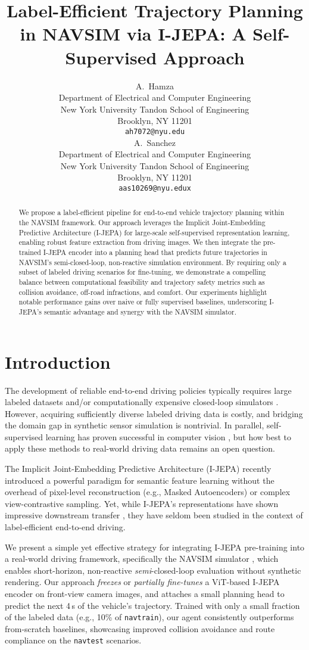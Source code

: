\documentclass{article}
\title{Label-Efficient Trajectory Planning in NAVSIM via I-JEPA: A Self-Supervised Approach}
\author{%
  A.~Hamza \\
  Department of Electrical and Computer Engineering \\
  New York University Tandon School of Engineering \\
  Brooklyn, NY 11201 \\
  \texttt{ah7072@nyu.edu} \\
  \And
  A.~Sanchez \\
  Department of Electrical and Computer Engineering \\
  New York University Tandon School of Engineering \\
  Brooklyn, NY 11201 \\
  \texttt{aas10269@nyu.edux} \\
}
\begin{document}
\maketitle

\begin{abstract}
We propose a label-efficient pipeline for end-to-end vehicle trajectory planning within the NAVSIM framework. Our approach leverages the Implicit Joint-Embedding Predictive Architecture (I-JEPA) for large-scale self-supervised representation learning, enabling robust feature extraction from driving images. We then integrate the pre-trained I-JEPA encoder into a planning head that predicts future trajectories in NAVSIM's semi-closed-loop, non-reactive simulation environment. By requiring only a subset of labeled driving scenarios for fine-tuning, we demonstrate a compelling balance between computational feasibility and trajectory safety metrics such as collision avoidance, off-road infractions, and comfort. Our experiments highlight notable performance gains over naive or fully supervised baselines, underscoring I-JEPA's semantic advantage and synergy with the NAVSIM simulator. 
\end{abstract}

\section{Introduction}
The development of reliable end-to-end driving policies typically requires large labeled datasets and/or computationally expensive closed-loop simulators \cite{carla, chen2020learning}. However, acquiring sufficiently diverse labeled driving data is costly, and bridging the domain gap in synthetic sensor simulation is nontrivial. In parallel, self-supervised learning has proven successful in computer vision \cite{chen2020simple, he2022mae}, but how best to apply these methods to real-world driving data remains an open question.

The Implicit Joint-Embedding Predictive Architecture (I-JEPA) \cite{assran2023ijepa} recently introduced a powerful paradigm for semantic feature learning without the overhead of pixel-level reconstruction (e.g., Masked Autoencoders) or complex view-contrastive sampling. Yet, while I-JEPA's representations have shown impressive downstream transfer \cite{assran2023ijepa}, they have seldom been studied in the context of label-efficient end-to-end driving. 

We present a simple yet effective strategy for integrating I-JEPA pre-training into a real-world driving framework, specifically the NAVSIM simulator \cite{dauner2024navsim}, which enables short-horizon, non-reactive \emph{semi}-closed-loop evaluation without synthetic rendering. Our approach \emph{freezes} or \emph{partially fine-tunes} a ViT-based I-JEPA encoder on front-view camera images, and attaches a small planning head to predict the next 4\,s of the vehicle’s trajectory. Trained with only a small fraction of the labeled data (e.g., 10\% of \texttt{navtrain}), our agent consistently outperforms from-scratch baselines, showcasing improved collision avoidance and route compliance on the \texttt{navtest} scenarios. 
\end{document}
